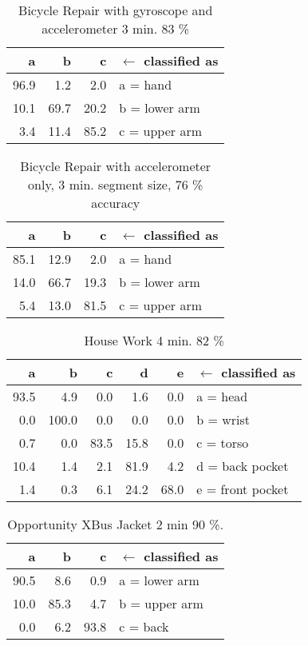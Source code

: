\begin{table}[!t]
\caption{Bicycle Repair with gyroscope and accelerometer 3 min. 83 \%}
\centering
\begin{tabular}{|r r r l|}\midrule
a &b &c &$\gets$ classified as\\\midrule
96.9 &1.2 &2.0 &a = hand\\
10.1 &69.7 &20.2 &b = lower arm\\
3.4 &11.4 &85.2 &c = upper arm\\
\bottomrule
\end{tabular}
\label{bicycle1}
\end{table}

\begin{table}[!t]
\caption[Bicycle Repair with accelerometer only]{Bicycle Repair with accelerometer only, 3 min. segment size, 76 \% accuracy}
\centering
\begin{tabular}{|r r r l|}\midrule
a &b &c &$\gets$ classified as\\\midrule
85.1 &12.9 &2.0 &a = hand\\
14.0 &66.7 &19.3 &b = lower arm\\
5.4 &13.0 &81.5 &c = upper arm\\
\bottomrule
\end{tabular}
\label{bicycle2}
\end{table}


\begin{table}[!t]
\caption{House Work  4 min. 82 \%}
\centering
\begin{tabular}{|r r r r r l|}\midrule
a &b &c &d &e &$\gets$ classified as\\\midrule
93.5 &4.9 &0.0 &1.6 &0.0 &a = head\\
0.0 &100.0 &0.0 &0.0 &0.0 &b = wrist\\
0.7 &0.0 &83.5 &15.8 &0.0 &c = torso\\
10.4 &1.4 &2.1 &81.9 &4.2 &d = back pocket\\
1.4 &0.3 &6.1 &24.2 &68.0 &e = front pocket\\
\bottomrule
\end{tabular}
\end{table}


\begin{table}[!t]
\caption{Opportunity XBus Jacket 2 min 90 \%.}
\centering
\begin{tabular}{|r r r l|}\midrule
a &b &c &$\gets$ classified as\\\midrule
90.5 &8.6 &0.9 &a = lower arm\\
10.0 &85.3 &4.7 &b = upper arm\\
0.0 &6.2 &93.8 &c = back\\
\bottomrule
\end{tabular}
\label{tab:opp}
\end{table}

